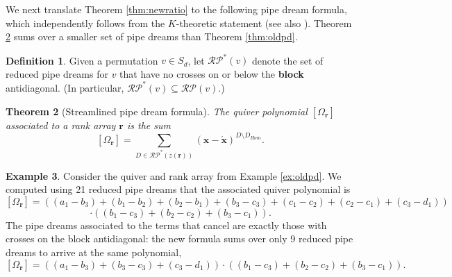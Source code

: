 \documentclass[reqno]{amsart}
\numberwithin{equation}{section}
\newtheorem{theorem}{Theorem}[section]
\theoremstyle{definition}
\newtheorem{definition}[theorem]{Definition}
\newtheorem{example}[theorem]{Example}
\theoremstyle{remark}
\begin{document}
We next translate Theorem \ref{thm:newratio} to the following pipe dream formula, which independently follows from the $K$-theoretic statement \cite[Corollary 5.1]{B04} (see also \cite[Corollary 2.2]{BR04}). Theorem \ref{thm:newpd} sums over a smaller set of pipe dreams than Theorem \ref{thm:oldpd}.
\begin{definition}
Given a permutation $v \in S_d$, let $\mathcal{RP}^*(v)$ denote the set of reduced pipe dreams for $v$ that have no crosses on or below the \textbf{block} antidiagonal. (In particular, $\mathcal{RP}^*(v) \subseteq \mathcal{RP}(v)$.)
\end{definition}
\begin{theorem}[Streamlined pipe dream formula]\label{thm:newpd}
The quiver polynomial $[\Omega_{\mathbf{r}}]$ associated to a rank array $\mathbf{r}$ is the sum
   \[[\Omega_{\mathbf{r}}]=\sum_{D \in \mathcal{RP}^*(z(\mathbf{r}))} (\mathbf{x}-\mathring{\mathbf{x}})^{D\setminus D_{Hom}}.\] 
\end{theorem}
\begin{example}
Consider the quiver and rank array from Example \ref{ex:oldpd}. We computed using 21 reduced pipe dreams that the associated quiver polynomial is
\[[\Omega_{\mathbf{r}}]=((a_1-b_3)+(b_1-b_2)+(b_2-b_1)+(b_3-c_3)+(c_1-c_2)+(c_2-c_1)+(c_3-d_1))\]\[\cdot ((b_1-c_3)+(b_2-c_2)+(b_3-c_1)).\]
The pipe dreams associated to the terms that cancel are exactly those with crosses on the block antidiagonal: the new formula sums over only 9 reduced pipe dreams to arrive at the same polynomial,
\[[\Omega_{\mathbf{r}}]=((a_1-b_3)+(b_3-c_3)+(c_3-d_1))\cdot ((b_1-c_3)+(b_2-c_2)+(b_3-c_1)).\]
\end{example}
\end{document}
